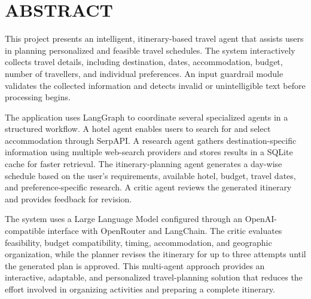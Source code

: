 \documentclass[12pt,a4paper]{report}
\begin{document}
\newpage
\thispagestyle{empty}

\chapter*{ABSTRACT}
\label{sec:abstract}

This project presents an intelligent, itinerary-based travel agent that assists users in planning personalized and feasible travel schedules. The system interactively collects travel details, including destination, dates, accommodation, budget, number of travellers, and individual preferences. An input guardrail module validates the collected information and detects invalid or unintelligible text before processing begins.

The application uses LangGraph to coordinate several specialized agents in a structured workflow. A hotel agent enables users to search for and select accommodation through SerpAPI. A research agent gathers destination-specific information using multiple web-search providers and stores results in a SQLite cache for faster retrieval. The itinerary-planning agent generates a day-wise schedule based on the user’s requirements, available hotel, budget, travel dates, and preference-specific research. A critic agent reviews the generated itinerary and provides feedback for revision.

The system uses a Large Language Model configured through an OpenAI-compatible interface with OpenRouter and LangChain. The critic evaluates feasibility, budget compatibility, timing, accommodation, and geographic organization, while the planner revises the itinerary for up to three attempts until the generated plan is approved. This multi-agent approach provides an interactive, adaptable, and personalized travel-planning solution that reduces the effort involved in organizing activities and preparing a complete itinerary.

\newpage
\end{document}
